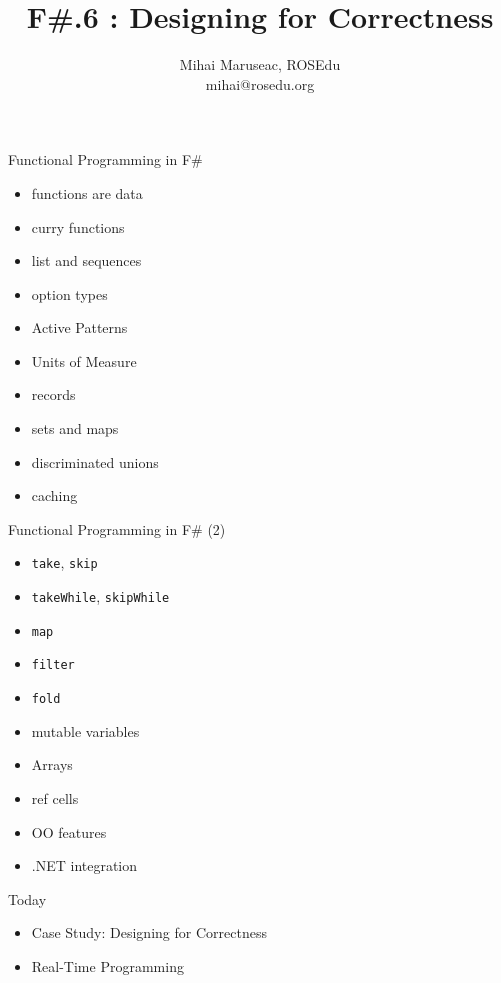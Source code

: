 \documentclass{beamer}
\title{F\#.6 : Designing for Correctness}
\author{Mihai Maruseac, ROSEdu\\mihai@rosedu.org}
\begin{document}
\maketitle

\begin{frame}
  \tableofcontents
\end{frame}

\begin{frame}{Functional Programming in F\#}
  \begin{itemize}
    \item functions are data
    \item curry functions
    \item list and sequences
    \item option types
    \item Active Patterns
    \item Units of Measure
    \item records
    \item sets and maps
    \item discriminated unions
    \item caching
  \end{itemize}
\end{frame}

\begin{frame}{Functional Programming in F\# (2)}
  \begin{itemize}
    \item \texttt{take}, \texttt{skip}
    \item \texttt{takeWhile}, \texttt{skipWhile}
    \item \texttt{map}
    \item \texttt{filter}
    \item \texttt{fold}
    \item mutable variables
    \item Arrays
    \item ref cells
    \item OO features
    \item .NET integration
  \end{itemize}
\end{frame}

\begin{frame}{Today}
  \begin{itemize}
    \item Case Study: Designing for Correctness
    \item Real-Time Programming
  \end{itemize}
\end{frame}
\end{document}
